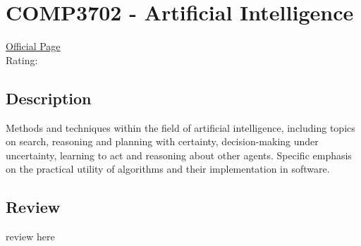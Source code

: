 \hypertarget{COMP3702}{\section{COMP3702 - Artificial Intelligence}}

\large
\textcolor{turbo_purple}{\href{https://my.uq.edu.au/programs-courses/course.html?course_code=COMP3702}{Official Page}} \\
Rating: \cstar\cstar\cstar\cstar\ostar

\normalsize
\subsection*{Description}
Methods and techniques within the field of artificial intelligence, including topics on search, reasoning and planning with certainty, decision-making under uncertainty, learning to act and reasoning about other agents.
Specific emphasis on the practical utility of algorithms and their implementation in software.

\subsection*{Review}
review here
